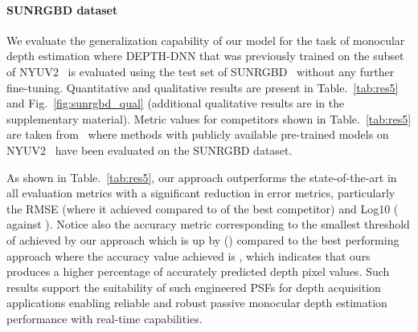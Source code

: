 \documentclass[preprint,5p,twocolumn]{elsarticle}
\begin{document}
\paragraph{SUNRGBD dataset}
We evaluate the generalization capability of our model for the task of monocular depth estimation where DEPTH-DNN that was previously trained on the subset of NYUV2~\cite{eigen2014depth} is evaluated using the test set of SUNRGBD~\cite{song2015sun} without any further fine-tuning. Quantitative and qualitative results are present in Table.~\ref{tab:res5} and Fig.~\ref{fig:sunrgbd_qual} (additional qualitative results are in the supplementary material). Metric values for competitors shown in Table.~\ref{tab:res5} are taken from~\cite{bhat2020adabins} where methods with publicly available pre-trained models on NYUV2~\cite{eigen2014depth} have been evaluated on the SUNRGBD dataset.

\begin{table}[h!]
\begin{center}
\end{center}
\centering
\caption{Quantitative comparison with the state-of-the-art methods for monocular depth estimation task on SUNRGBD~\cite{song2015sun} test set.}
\label{tab:res5}
\end{table}

As shown in Table.~\ref{tab:res5}, our approach outperforms the state-of-the-art in all evaluation metrics with a significant reduction in error metrics, particularly the RMSE (where it achieved  compared to  of the best competitor) and Log10 ( against ). Notice also the accuracy metric  corresponding to the smallest threshold of  achieved by our approach which is up by  () compared to the best performing approach where the accuracy value achieved is , which indicates that ours produces a higher percentage of accurately predicted depth pixel values.
Such results support the suitability of such engineered PSFs for depth acquisition applications enabling reliable and robust passive monocular depth estimation performance with real-time capabilities. 
\end{document}
